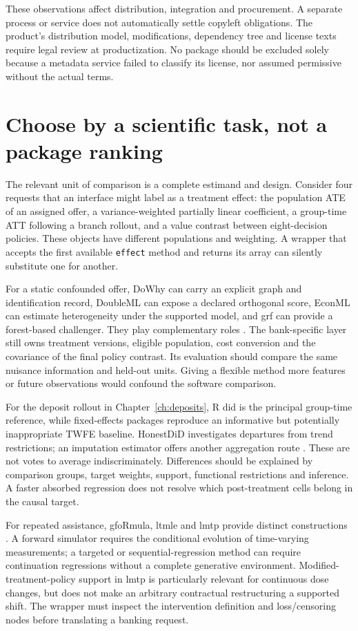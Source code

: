 These observations affect distribution, integration and procurement.
A separate process or service does not automatically settle copyleft
obligations. The product's distribution model, modifications, dependency
tree and license texts require legal review at productization. No package
should be excluded solely because a metadata service failed to classify
its license, nor assumed permissive without the actual terms.

\section{Choose by a scientific task, not a package ranking}
The relevant unit of comparison is a complete estimand and design. Consider
four requests that an interface might label as a treatment effect: the
population ATE of an assigned offer, a variance-weighted partially linear
coefficient, a group-time ATT following a branch rollout, and a value
contrast between eight-decision policies. These objects have different
populations and weighting. A wrapper that accepts the first available
\texttt{effect} method and returns its array can silently substitute one
for another.

For a static confounded offer, DoWhy can carry an explicit graph and
identification record, DoubleML can expose a declared orthogonal score,
EconML can estimate heterogeneity under the supported model, and grf can
provide a forest-based challenger. They play complementary roles
\citep{sw_dowhy,sw_doubleml,sw_econml,sw_grf}. The bank-specific layer
still owns treatment versions, eligible population, cost conversion and
the covariance of the final policy contrast. Its evaluation should compare
the same nuisance information and held-out units. Giving a flexible method
more features or future observations would confound the software comparison.

For the deposit rollout in Chapter~\ref{ch:deposits}, R did is the principal
group-time reference, while fixed-effects packages reproduce an informative
but potentially inappropriate TWFE baseline. HonestDiD investigates
departures from trend restrictions; an imputation estimator offers another
aggregation route \citep{sw_did,sw_honestdid,borusyak2024}.
These are not votes to average indiscriminately. Differences should be
explained by comparison groups, target weights, support, functional
restrictions and inference. A faster absorbed regression does not resolve
which post-treatment cells belong in the causal target.

For repeated assistance, gfoRmula, ltmle and lmtp provide distinct
constructions \citep{sw_gformula,sw_ltmle,sw_lmtp}. A forward simulator
requires the conditional evolution of time-varying measurements; a targeted
or sequential-regression method can require continuation regressions
without a complete generative environment. Modified-treatment-policy
support in lmtp is particularly relevant for continuous dose changes,
but does not make an arbitrary contractual restructuring a supported shift.
The wrapper must inspect the intervention definition and loss/censoring
nodes before translating a banking request.

